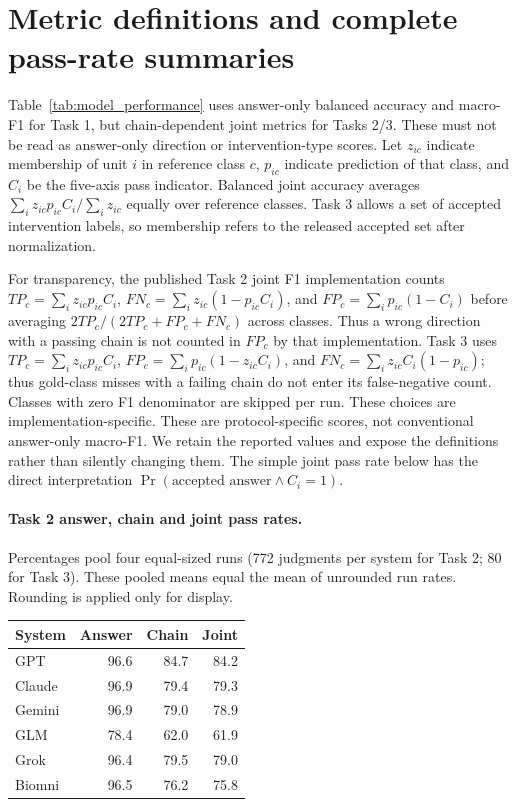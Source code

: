 \clearpage
\section{Metric definitions and complete pass-rate summaries}\label{app:metrics}
Table~\ref{tab:model_performance} uses answer-only balanced accuracy and macro-F1 for Task 1, but chain-dependent joint metrics for Tasks 2/3. These must not be read as answer-only direction or intervention-type scores. Let $z_{ic}$ indicate membership of unit $i$ in reference class $c$, $p_{ic}$ indicate prediction of that class, and $C_i$ be the five-axis pass indicator. Balanced joint accuracy averages $\sum_i z_{ic}p_{ic}C_i/\sum_i z_{ic}$ equally over reference classes. Task 3 allows a set of accepted intervention labels, so membership refers to the released accepted set after normalization.

For transparency, the published Task 2 joint F1 implementation counts $TP_c=\sum_i z_{ic}p_{ic}C_i$, $FN_c=\sum_i z_{ic}(1-p_{ic}C_i)$, and $FP_c=\sum_i p_{ic}(1-C_i)$ before averaging $2TP_c/(2TP_c+FP_c+FN_c)$ across classes. Thus a wrong direction with a passing chain is not counted in $FP_c$ by that implementation. Task 3 uses $TP_c=\sum_i z_{ic}p_{ic}C_i$, $FP_c=\sum_i p_{ic}(1-z_{ic}C_i)$, and $FN_c=\sum_i z_{ic}C_i(1-p_{ic})$; thus gold-class misses with a failing chain do not enter its false-negative count. Classes with zero F1 denominator are skipped per run. These choices are implementation-specific. These are protocol-specific scores, not conventional answer-only macro-F1. We retain the reported values and expose the definitions rather than silently changing them. The simple joint pass rate below has the direct interpretation $\Pr(\text{accepted answer}\land C_i=1)$.

\paragraph{Task 2 answer, chain and joint pass rates.} Percentages pool four equal-sized runs (772 judgments per system for Task 2; 80 for Task 3). These pooled means equal the mean of unrounded run rates. Rounding is applied only for display.
\begin{center}
\begin{tabular}{lrrr}
\toprule
System & Answer & Chain & Joint \\
\midrule
GPT & 96.6 & 84.7 & 84.2 \\
Claude & 96.9 & 79.4 & 79.3 \\
Gemini & 96.9 & 79.0 & 78.9 \\
GLM & 78.4 & 62.0 & 61.9 \\
Grok & 96.4 & 79.5 & 79.0 \\
Biomni & 96.5 & 76.2 & 75.8 \\
\bottomrule
\end{tabular}
\end{center}
